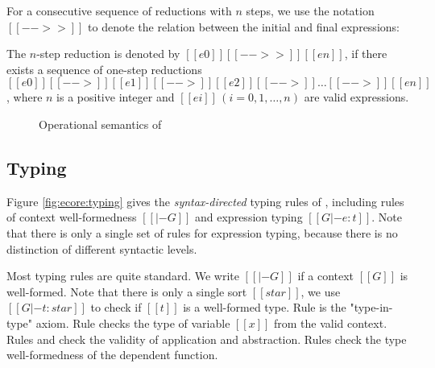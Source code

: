 For a consecutive sequence of reductions
with $n$ steps, we use the notation $[[-->>]]$ to denote the relation
between the initial and final expressions:

\begin{dfn}
    The $n$-step reduction is denoted by $[[e0]] [[-->>]] [[en]]$, if
    there exists a sequence of one-step reductions $[[e0]] [[-->]]
    [[e1]] [[-->]] [[e2]] [[-->]] \dots [[-->]] [[en]]$, where $n$ is
    a positive integer and $[[ei]]\,(i=0,1,\dots,n)$ are valid
    expressions.
\end{dfn}

\begin{figure}
    \ottdefnstep{}
    \caption{Operational semantics of \ecore}
    \label{fig:ecore:opsem}
\end{figure}

\subsection{Typing}\label{sec:ecore:type}

Figure \ref{fig:ecore:typing} gives the \emph{syntax-directed} typing
rules of \ecore, including rules of context well-formedness $[[|- G]]$
and expression typing $[[G |- e : t]]$. Note that there is only a
single set of rules for expression typing, because there is no
distinction of different syntactic levels.

Most typing rules are quite standard. We write $[[|- G]]$ if a context
$[[G]]$ is well-formed. Note that there is only a single sort
$[[star]]$, we use $[[G |- t : star]]$ to check if $[[t]]$ is a
well-formed type. Rule  is the "type-in-type"
axiom. Rule  checks the type of variable $[[x]]$ from
the valid context. Rules  and  check
the validity of application and abstraction. Rules 
check the type well-formedness of the dependent function.

